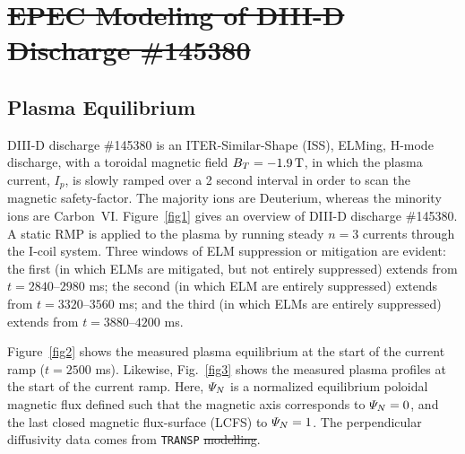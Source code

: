 \documentclass[12pt,prb,aps]{revtex4-1}
\providecommand{\DIFadd}[1]{{\protect\color{blue}\uwave{#1}}} %
\providecommand{\DIFdel}[1]{{\protect\color{red}\sout{#1}}}                      %
\providecommand{\DIFaddbegin}{} %
\providecommand{\DIFaddend}{} %
\providecommand{\DIFdelbegin}{} %
\providecommand{\DIFdelend}{} %
\begin{document}
\DIFdelbegin \section{\DIFdel{EPEC Modeling of DIII-D Discharge \#145380}}
\addtocounter{section}{-1}%
\DIFdelend \subsection{Plasma Equilibrium}
DIII-D discharge \#145380 is an ITER-Similar-Shape (ISS), ELMing, H-mode discharge, with a toroidal magnetic field $B_T=-1.9\,{\rm T}$, in which the
plasma current, $I_p$, is slowly ramped over a 2 second interval in order to scan the magnetic safety-factor.\cite{d3d,d3d2} The majority ions are Deuterium, whereas the
minority ions are Carbon~VI.
Figure~\ref{fig1} gives an overview of DIII-D discharge \#145380. 
A static RMP is applied to the plasma by running steady $n=3$ currents through the I-coil system.\cite{icoil}
Three windows of ELM suppression or mitigation are evident: the first (in which ELMs are mitigated, but not
entirely suppressed) extends from $t=2840$--$2980$ ms; the
second (in which ELM are entirely suppressed) extends from $t=3320$--$3560$ ms; and the third (in which ELMs are
entirely suppressed) extends from $t=3880$--$4200$ ms.

Figure~\ref{fig2} shows the measured plasma equilibrium at the start of the current ramp ($t=2500$ ms). Likewise,
Fig.~\ref{fig3} shows the measured plasma profiles at the start of the current ramp. Here, ${\mit\Psi}_N$ is a
normalized equilibrium poloidal magnetic flux defined such that the magnetic axis corresponds to ${\mit\Psi}_N=0$, 
and the last closed magnetic flux-surface (LCFS) to ${\mit\Psi}_N=1$. The perpendicular
diffusivity data comes from {\tt TRANSP} \DIFdelbegin \DIFdel{modelling}\DIFdelend \DIFaddbegin \DIFadd{modeling}\DIFaddend .\cite{transp}  
\end{document}
